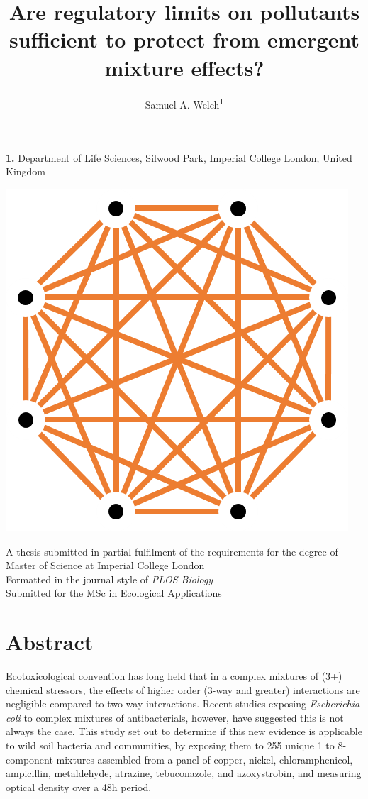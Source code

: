 \documentclass[10pt]{article}
\title{\Large{Are regulatory limits on pollutants sufficient to protect from emergent mixture effects?}}
\author{Samuel A. Welch\textsuperscript{1}}
\makeatletter
\renewcommand{\maketitle}{\bgroup\setlength{\parindent}{0pt}
\begin{flushleft}
  \textbf{\@title}

  \@author
\end{flushleft}\egroup
}
\makeatother
\begin{document}
\begin{flushleft}
\maketitle
\bigskip
\textbf{1.} Department of Life Sciences, Silwood Park, Imperial College London, United Kingdom
\bigskip
\end{flushleft}
\vspace{0.5cm}

\begin{center}
\includegraphics[scale = 0.15]{docs/badnews8ways.png}

\vspace{1.0cm}

A thesis submitted in partial fulfilment of the requirements for the degree of Master of Science at Imperial College London\\
\smallskip
Formatted in the journal style of \textit{PLOS Biology}\\
\smallskip
Submitted for the MSc in Ecological Applications
\end{center}

\section*{Abstract}
Ecotoxicological convention has long held that in a complex mixtures of (3+) chemical stressors, the effects of higher order (3-way and greater) interactions are negligible compared to two-way interactions. Recent studies exposing \textit{Escherichia coli} to complex mixtures of antibacterials, however, have suggested this is not always the case. This study set out to determine if this new evidence is applicable to wild soil bacteria and communities, by exposing them to 255 unique 1 to 8-component mixtures assembled from a panel of copper, nickel, chloramphenicol, ampicillin, metaldehyde, atrazine, tebuconazole, and azoxystrobin, and measuring optical density over a 48h period.
\end{document}
